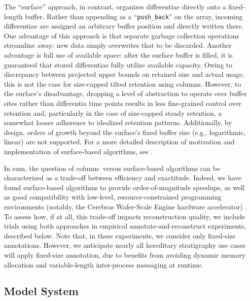 The ``surface'' approach, in contrast, organizes differentiae directly onto a fixed-length buffer.
Rather than appending as a ``\texttt{push\_back}'' on the array, incoming differentiae are assigned an arbitrary buffer position and directly written there.
One advantage of this approach is that separate garbage collection operations streamline away: new data simply overwrites that to be discarded.
Another advantage is full use of available space: after the surface buffer is filled, it is guaranteed that stored differentiae fully utilize available capacity.
Owing to discrepancy between projected upper bounds on retained size and actual usage, this is not the case for size-capped tilted retention using columns.
However, to the surface's disadvantage, dropping a level of abstraction to operate over buffer sites rather than differentia time points results in less fine-grained control over retention and, particularly in the case of size-capped steady retention, a somewhat looser adherence to idealized retention patterns.
Additionally, by design, orders of growth beyond the surface's fixed buffer size (e.g., logarithmic, linear) are not supported.
For a more detailed description of motivation and implementation of surface-based algorithms, see \citep{moreno2024trackable}.

In sum, the question of column- versus surface-based algorithms can be characterized as a trade-off between efficiency and exactitude.
Indeed, we have found surface-based algorithms to provide order-of-magnitude speedups, as well as good compatibility with low-level, resource-constrained programming environments (notably, the Cerebras Wafer-Scale Engine hardware accelerator) \citep{moreno2024TODO}.
To assess how, if at all, this trade-off impacts reconstruction quality, we include trials using both approaches in empirical annotate-and-reconstruct experiments, described below.
Note that, in these experiments, we consider only fixed-size annotations.
However, we anticipate nearly all hereditary stratigraphy use cases will apply fixed-size annotation, due to benefits from avoiding dynamic memory allocation and variable-length inter-process messaging at runtime.

\subsection{Model System}  %

